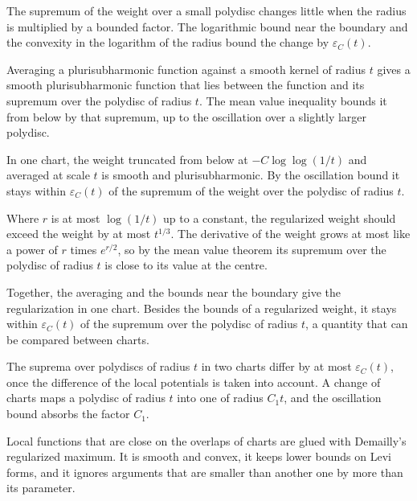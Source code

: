 The supremum of the weight over a small polydisc changes little when the radius is multiplied by a bounded factor. The
logarithmic bound near the boundary and the convexity in the logarithm of the radius bound the change by
$\varepsilon_C(t)$.

Averaging a plurisubharmonic function against a smooth kernel of radius $t$ gives a smooth plurisubharmonic function that
lies between the function and its supremum over the polydisc of radius $t$. The mean value inequality bounds it from
below by that supremum, up to the oscillation over a slightly larger polydisc.

In one chart, the weight truncated from below at $-C\log\log(1/t)$ and averaged at scale $t$ is smooth and
plurisubharmonic. By the oscillation bound it stays within $\varepsilon_C(t)$ of the supremum of the weight over the
polydisc of radius $t$.

Where $r$ is at most $\log(1/t)$ up to a constant, the regularized weight should exceed the weight by at most $t^{1/3}$.
The derivative of the weight grows at most like a power of $r$ times $e^{r/2}$, so by the mean value theorem its
supremum over the polydisc of radius $t$ is close to its value at the centre.

Together, the averaging and the bounds near the boundary give the regularization in one chart. Besides the bounds of a
regularized weight, it stays within $\varepsilon_C(t)$ of the supremum over the polydisc of radius $t$, a quantity that
can be compared between charts.

The suprema over polydiscs of radius $t$ in two charts differ by at most $\varepsilon_C(t)$, once the difference of the
local potentials is taken into account. A change of charts maps a polydisc of radius $t$ into one of radius $C_1t$, and
the oscillation bound absorbs the factor $C_1$.

Local functions that are close on the overlaps of charts are glued with Demailly's regularized maximum. It is smooth and
convex, it keeps lower bounds on Levi forms, and it ignores arguments that are smaller than another one by more than its
parameter.

